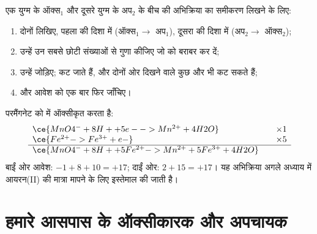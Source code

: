 \begin{method}\label{met:g11:redox:combine}
एक युग्म के  ऑक्स$_1$ और दूसरे युग्म के 
अप$_2$ के बीच की अभिक्रिया का समीकरण लिखने के लिए:
\begin{enumerate}
  \item दोनों  लिखिए, पहला
         की दिशा में (ऑक्स$_1 \to$ अप$_1$), दूसरा
         की दिशा में (अप$_2 \to$ ऑक्स$_2$);
  \item उन्हें उन सबसे छोटी संख्याओं से गुणा कीजिए जो  को
        बराबर कर दें;
  \item उन्हें जोड़िए;  कट जाते हैं, और दोनों ओर दिखने वाले कुछ  और
         भी कट सकते हैं;
  \item {} और आवेश को एक बार फिर जाँचिए।
\end{enumerate}
\end{method}

\begin{example}\label{ex:g11:redox:mno4-fe}
परमैंगनेट    को  में ऑक्सीकृत करता है:
\[
\begin{array}{l@{\qquad}l}
  \ce{MnO4^- + 8H+ + 5e- -> Mn^{2+} + 4H2O} & \times 1\\
  \ce{Fe^{2+} -> Fe^{3+} + e-} & \times 5\\
  \hline
  \ce{MnO4^- + 8H+ + 5Fe^{2+} -> Mn^{2+} + 5Fe^{3+} + 4H2O} &
\end{array}
\]
बाईं ओर आवेश: $-1 + 8 + 10 = +17$; दाईं ओर: $2 + 15 = +17$।
यह अभिक्रिया अगले अध्याय में आयरन(II) की मात्रा मापने के लिए
इस्तेमाल की जाती है।
\end{example}

\section{हमारे आसपास के ऑक्सीकारक और अपचायक}

